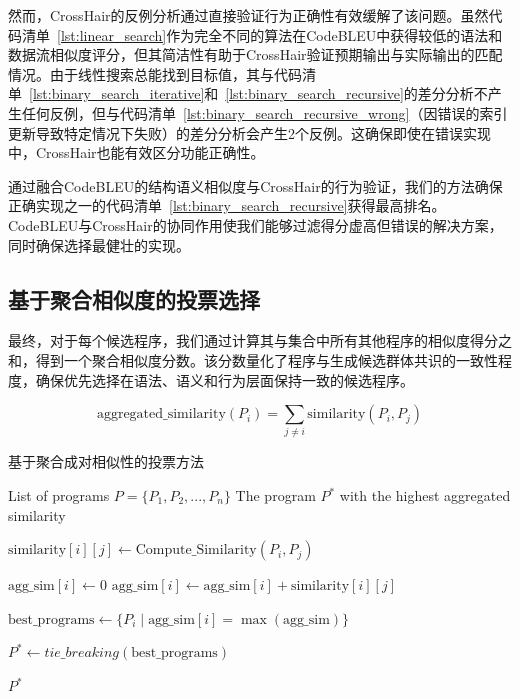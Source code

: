 \documentclass{article}
\begin{document}
然而，CrossHair的反例分析通过直接验证行为正确性有效缓解了该问题。虽然代码清单~\ref{lst:linear_search}作为完全不同的算法在CodeBLEU中获得较低的语法和数据流相似度评分，但其简洁性有助于CrossHair验证预期输出与实际输出的匹配情况。由于线性搜索总能找到目标值，其与代码清单~\ref{lst:binary_search_iterative}和~\ref{lst:binary_search_recursive}的差分分析不产生任何反例，但与代码清单~\ref{lst:binary_search_recursive_wrong}（因错误的索引更新导致特定情况下失败）的差分分析会产生2个反例。这确保即使在错误实现中，CrossHair也能有效区分功能正确性。

通过融合CodeBLEU的结构语义相似度与CrossHair的行为验证，我们的方法确保正确实现之一的代码清单~\ref{lst:binary_search_recursive}获得最高排名。CodeBLEU与CrossHair的协同作用使我们能够过滤得分虚高但错误的解决方案，同时确保选择最健壮的实现。
\subsection{基于聚合相似度的投票选择}

最终，对于每个候选程序，我们通过计算其与集合中所有其他程序的相似度得分之和，得到一个聚合相似度分数。该分数量化了程序与生成候选群体共识的一致性程度，确保优先选择在语法、语义和行为层面保持一致的候选程序。

\begin{equation}
\text{aggregated\_similarity}(P_i) = \sum_{j \neq i} \text{similarity}(P_i, P_j)
\end{equation}

\begin{algorithm}[t!]
\caption{基于聚合成对相似性的投票方法}
\label{alg:ensemble_selection}
\begin{algorithmic}[1]

\Require List of programs \( P = \{P_1, P_2, ..., P_n\} \)
\Ensure The program \( P^* \) with the highest aggregated similarity

        \State \( \text{similarity}[i][j] \gets \text{Compute\_Similarity}(P_i, P_j) \)
    \EndFor
\EndFor

    \State \( \text{agg\_sim}[i] \gets 0 \)
        \State \( \text{agg\_sim}[i] \gets \text{agg\_sim}[i] + \text{similarity}[i][j] \)
    \EndFor
\EndFor

\State \( \text{best\_programs} \gets \{ P_i \mid \text{agg\_sim}[i] = \max(\text{agg\_sim}) \} \)

\State \( P^* \gets tie\_breaking(\text{best\_programs}) \)

\State \Return \( P^* \)

\end{algorithmic}
\end{algorithm}
\end{document}

